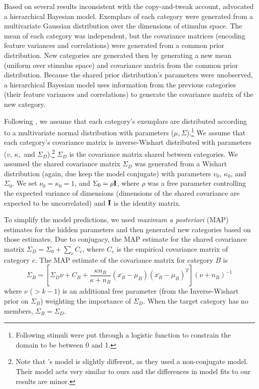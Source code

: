\documentclass[10pt,letterpaper]{article}
\begin{document}
Based on several results inconsistent with the copy-and-tweak account, \citet{jern2013probabilistic} advocated a hierarchical Bayesian model. Exemplars of each category were generated from a multivariate Gaussian distribution over the dimensions of stimulus space. The mean of each category was independent, but the covariance matrices (encoding feature variances and correlations) were generated from a common prior distribution. New categories are generated then by generating a new mean (uniform over stimulus space) and covariance matrix from the common prior distribution. Because the shared prior distribution's parameters were unobserved, a hierarchical Bayesian model uses information from the previous categories (their feature variances and correlations) to generate the covariance matrix of the new category.

Following \citet{jern2013probabilistic}, we assume that each category's exemplars are distributed according to a multivariate normal distribution with parameters ($\mu, \Sigma$).\footnote{Following \citet{jern2013probabilistic} stimuli were put through a logistic function to constrain the domain to be between 0 and 1.} We assume that each category's covariance matrix is inverse-Wishart distributed with parameters ($v$, $\kappa,$ and $\Sigma_D$).\footnote{Note that \citet{jern2013probabilistic}'s model is slightly different, as they used a non-conjugate model. Their model acts very similar to ours and the differences in model fits to our results are minor.} $\Sigma_D$ is the covariance matrix shared between categories. We assumed the shared covariance matrix $\Sigma_D$ was generated from a Wishart distribution (again, due keep the model conjugate) with parameters $v_0$, $\kappa_0$, and $\Sigma_0$. We set $\nu_0 = \kappa_0 = 1$, and $\Sigma_0 = \rho {\bf I}$, where $\rho$ was a free parameter controlling the expected variance of dimensions (dimensions of the shared covariance are expected to be uncorrelated) and ${\bf I}$ is the identity matrix.

To simplify the model predictions, we used {\em maximum a posteriori} (MAP) estimates for the hidden parameters and then generated new categories based on those estimates. Due to conjugacy, the MAP estimate for the shared covariance matrix $\Sigma_D = \Sigma_0 + \sum_c{C_c}$, where $C_c$ is the empirical covariance matrix of category $c$. The MAP estimate of the covariance matrix for category $B$ is 
\begin{equation}
  \Sigma_B = \left[ \Sigma_D \nu + C_B +
    \dfrac
    {\kappa n_B}
    {\kappa + n_B}
    (\bar{x_B}-\mu_B)(\bar{x_B}-\mu_B)^T
  \right] (\nu + n_B)^{-1}
  \label{eq:Sigma_B}
\end{equation}
%
where $\nu$ ($>k-1$) is an additional free parameter (from the Inverse-Wishart prior on $\Sigma_B$) weighting the importance of $\Sigma_{D}$. When the target category has no members, $\Sigma_B = \Sigma_D$.
\end{document}
